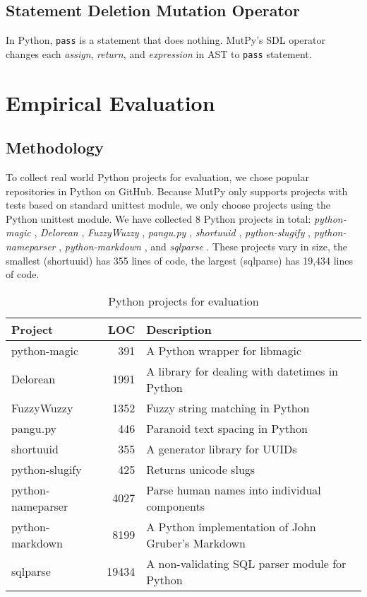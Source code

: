 \documentclass[12pt]{article}
\begin{document}
\subsection{Statement Deletion Mutation Operator}

In Python, \texttt{pass} is a statement that does nothing. MutPy's SDL operator changes each \emph{assign}, \emph{return}, and \emph{expression} in AST to \texttt{pass} statement.

\section{Empirical Evaluation}

\subsection{Methodology}

To collect real world Python projects for evaluation, we chose popular repositories in Python on GitHub. Because MutPy only supports projects with tests based on standard unittest module, we only choose projects using the Python unittest module. We have collected 8 Python projects in total: \emph{python-magic} \cite{python-magic}, \emph{Delorean} \cite{delorean}, \emph{FuzzyWuzzy} \cite{fuzzywuzzy}, \emph{pangu.py} \cite{pangu.py}, \emph{shortuuid} \cite{shortuuid}, \emph{python-slugify} \cite{python-slugify}, \emph{python-nameparser} \cite{python-nameparser}, \emph{python-markdown} \cite{python-markdown}, and \emph{sqlparse} \cite{sqlparse}. These projects vary in size, the smallest (shortuuid) has 355 lines of code, the largest (sqlparse) has 19,434 lines of code.

\begin{table}[H]
\begin{center}
\caption{Python projects for evaluation}
\begin{tabular}{|l|r|l|}
\hline
{\bf Project} & {\bf LOC} & {\bf Description} \\
\hline
python-magic      & 391   & A Python wrapper for libmagic \\
Delorean          & 1991  & A library for dealing with datetimes in Python \\
FuzzyWuzzy        & 1352  & Fuzzy string matching in Python \\
pangu.py          & 446   & Paranoid text spacing in Python \\
shortuuid         & 355   & A generator library for UUIDs \\
python-slugify    & 425   & Returns unicode slugs \\
python-nameparser & 4027  & Parse human names into individual components \\
python-markdown   & 8199  & A Python implementation of John Gruber’s Markdown \\
sqlparse          & 19434 & A non-validating SQL parser module for Python \\
\hline
\end{tabular}
\end{center}
\end{table}
\end{document}
